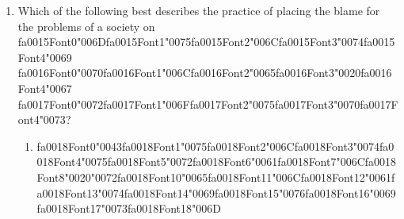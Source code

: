 \documentclass[12pt]{article}
\begin{document}
\begin{enumerate}[label=\arabic*.]
\begin{enumerate}[label=(\alph*)]
    \item {\csname fa0009Font0\endcsname\char"006D}{\csname fa0009Font1\endcsname\char"0075}{\csname fa0009Font2\endcsname\char"006C}{\csname fa0009Font3\endcsname\char"0074}{\csname fa0009Font4\endcsname\char"0069}{\csname fa0009Font5\endcsname\char"002D}{\csname fa0009Font6\endcsname\char"0070}{\csname fa0009Font7\endcsname\char"0061}{\csname fa0009Font8\endcsname\char"0072} {\csname fa0010Font0\endcsname\char"0074}{\csname fa0010Font1\endcsname\char"0079}{\csname fa0010Font2\endcsname\char"0020}{\csname fa0010Font3\endcsname\char"0073}{\csname fa0010Font4\endcsname\char"0079}{\csname fa0010Font5\endcsname\char"0073}{\csname fa0010Font6\endcsname\char"0074}{\csname fa0010Font7\endcsname\char"0065}{\csname fa0010Font8\endcsname\char"006D}
    \item {\char"0061}{\csname fa0011Font1\endcsname\char"0020}{\csname fa0011Font2\endcsname\char"006D}{\csname fa0011Font3\endcsname\char"0061}{\csname fa0011Font4\endcsname\char"0072} {\csname fa0012Font0\endcsname\char"006B}{\csname fa0012Font1\endcsname\char"0065}{\csname fa0012Font2\endcsname\char"0074}{\csname fa0012Font3\endcsname\char"002D}{\csname fa0012Font4\endcsname\char"0064}{\csname fa0012Font5\endcsname\char"0072} {\csname fa0013Font0\endcsname\char"0069}{\csname fa0013Font1\endcsname\char"0076}{\csname fa0013Font2\endcsname\char"0065}{\char"006E}{\csname fa0013Font4\endcsname\char"0020}{\csname fa0013Font5\endcsname\char"0065} {\csname fa0014Font0\endcsname\char"0063}{\char"006F}{\char"006E}{\char"006F}{\char"006D}{\char"0079}
\end{enumerate}
\item Which of the following best describes the practice of placing the blame for the problems of a society on {\csname fa0015Font0\endcsname\char"006D}{\csname fa0015Font1\endcsname\char"0075}{\csname fa0015Font2\endcsname\char"006C}{\csname fa0015Font3\endcsname\char"0074}{\csname fa0015Font4\endcsname\char"0069} {\csname fa0016Font0\endcsname\char"0070}{\csname fa0016Font1\endcsname\char"006C}{\csname fa0016Font2\endcsname\char"0065}{\csname fa0016Font3\endcsname\char"0020}{\csname fa0016Font4\endcsname\char"0067} {\csname fa0017Font0\endcsname\char"0072}{\csname fa0017Font1\endcsname\char"006F}{\csname fa0017Font2\endcsname\char"0075}{\csname fa0017Font3\endcsname\char"0070}{\csname fa0017Font4\endcsname\char"0073}?
\begin{enumerate}[label=(\alph*)]
    \item {\csname fa0018Font0\endcsname\char"0043}{\csname fa0018Font1\endcsname\char"0075}{\csname fa0018Font2\endcsname\char"006C}{\csname fa0018Font3\endcsname\char"0074}{\csname fa0018Font4\endcsname\char"0075}{\csname fa0018Font5\endcsname\char"0072}{\csname fa0018Font6\endcsname\char"0061}{\csname fa0018Font7\endcsname\char"006C}{\csname fa0018Font8\endcsname\char"0020}{\char"0072}{\csname fa0018Font10\endcsname\char"0065}{\csname fa0018Font11\endcsname\char"006C}{\csname fa0018Font12\endcsname\char"0061}{\csname fa0018Font13\endcsname\char"0074}{\csname fa0018Font14\endcsname\char"0069}{\csname fa0018Font15\endcsname\char"0076}{\csname fa0018Font16\endcsname\char"0069}{\csname fa0018Font17\endcsname\char"0073}{\csname fa0018Font18\endcsname\char"006D}

\end{enumerate}
\end{enumerate}
\end{document}
